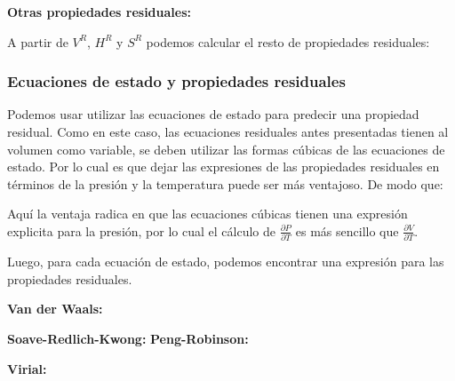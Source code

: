 
\vspace{0.5cm}

\textbf{Otras propiedades residuales:}

A partir de $V^R$, $H^R$ y $S^R$ podemos calcular el resto de propiedades residuales:


\subsubsection{Ecuaciones de estado y propiedades residuales}

Podemos usar utilizar las ecuaciones de estado para predecir una propiedad residual. Como en este caso, las ecuaciones residuales antes presentadas tienen al volumen como variable, se deben utilizar las formas cúbicas de las ecuaciones de estado. Por lo cual es que dejar 
las expresiones de las propiedades residuales en términos de la presión y la temperatura puede ser más ventajoso. De modo que:


Aquí la ventaja radica en que las ecuaciones cúbicas tienen una expresión explicita para la presión, por lo cual el cálculo de $\frac{\partial P}{\partial T}$ es más sencillo que $\frac{\partial V}{\partial T}$.

Luego, para cada ecuación de estado, podemos encontrar una expresión para las propiedades residuales.

\textbf{Van der Waals:}

\textbf{Soave-Redlich-Kwong:}
\break
\textbf{Peng-Robinson:}

\textbf{Virial:}

